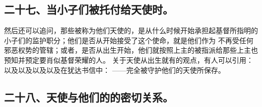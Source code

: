 
\subsection{二十七、当小子们被托付给天使时。}

然后还可以追问，那些被称为他们天使的，是从什么时候开始承担起基督所指明的小子们的监护职分；他们是否从开始接受了这个使命，就是他们作为 不再受任何邪恶权势的管辖；或者，是否从出生开始，他们就按照上主的被指派给那些上主也预知并预定要肖似基督荣耀的人。 关于天使从出生就有的观点，有人可以引用： 以及以及以及以及在犹达书信中： ——完全被守护他们的天使所保存。\par


\subsection{二十八、天使与他们的的密切关系。}

